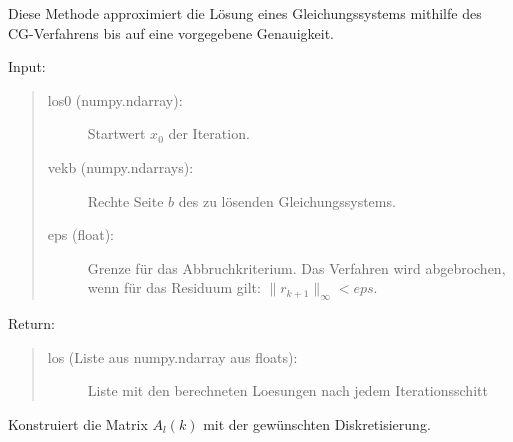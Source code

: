 \documentclass[letterpaper,10pt,ngerman, oneside, openright]{sphinxmanual}
\begin{document}
\begin{fulllineitems}
\begin{fulllineitems}
\end{fulllineitems}
\clearpage
{}


\begin{fulllineitems}
\label{\detokenize{index:sparse_erw.Sparse.cg_meth}}
Diese Methode approximiert die Lösung eines Gleichungssystems mithilfe des CG-Verfahrens
bis auf eine vorgegebene Genauigkeit.

\begin{description}
\item [{Input:}] 
\end{description}
\begin{quote}
\begin{description}
\item[{los0 (numpy.ndarray):}] \leavevmode
Startwert $x_0$ der Iteration.

\item[{vekb (numpy.ndarrays):}] \leavevmode
Rechte Seite $b$ des zu lösenden Gleichungssystems.

\item[{eps (float):}] \leavevmode
Grenze für das Abbruchkriterium. Das Verfahren wird abgebrochen, wenn für das Residuum gilt: $\|r_{k+1}\|_\infty<eps$.

\end{description}
\end{quote}

\begin{description}
\item [{Return:}] 
\end{description}
\begin{quote}
\begin{description}
\item[{los (Liste aus numpy.ndarray aus floats):}] \leavevmode
Liste mit den berechneten Loesungen nach jedem Iterationsschitt

\end{description}
\end{quote}

\end{fulllineitems}


\begin{fulllineitems}
\label{\detokenize{index:sparse_erw.Sparse.constr_mat_l_k}}
Konstruiert die Matrix $A_l(k)$ mit der gewünschten Diskretisierung.


\end{fulllineitems}
\end{fulllineitems}
\end{document}
